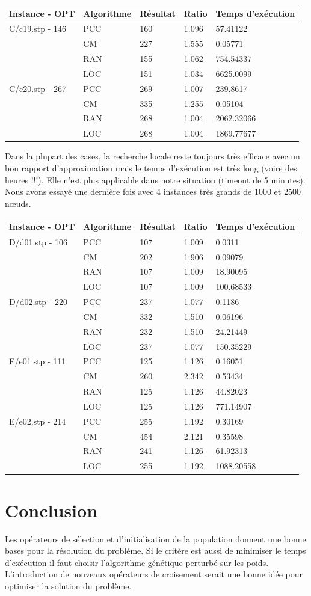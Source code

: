 \documentclass[12pt,a4paper]{article}
\begin{document}
\begin{center}
	\begin{tabular}{l|l|l|l|l}
		Instance - OPT & Algorithme & Résultat & Ratio & Temps d'exécution\\ \hline \hline
		C/c19.stp - 146&PCC&160&1.096&57.41122\\
		&CM&227&1.555&0.05771\\
		&RAN&155&1.062&754.54337\\
		&LOC&151&1.034&6625.0099\\\hline
		C/c20.stp - 267&PCC&269&1.007&239.8617\\
		&CM&335&1.255&0.05104\\
		&RAN&268&1.004&2062.32066\\
		&LOC&268&1.004&1869.77677\\\hline
	\end{tabular}
\end{center}		
Dans la plupart des cases, la recherche locale reste toujours très efficace avec un bon rapport d'approximation mais le temps d'exécution est très long (voire des heures !!!). Elle n'est plus applicable dans notre situation (timeout de 5 minutes).\\
Nous avons essayé une dernière fois avec 4 instances très grands de 1000 et 2500 nœuds.
\begin{center}
	\begin{tabular}{l|l|l|l|l}
		Instance - OPT & Algorithme & Résultat & Ratio & Temps d'exécution\\ \hline \hline
		D/d01.stp - 106&PCC&107&1.009&0.0311\\
		&CM&202&1.906&0.09079\\
		&RAN&107&1.009&18.90095\\
		&LOC&107&1.009&100.68533\\\hline
		D/d02.stp - 220&PCC&237&1.077&0.1186\\
		&CM&332&1.510&0.06196\\
		&RAN&232&1.510&24.21449\\
		&LOC&237&1.077&150.35229\\\hline
		E/e01.stp - 111&PCC&125&1.126&0.16051\\
		&CM&260&2.342&0.53434\\
		&RAN&125&1.126&44.82023\\
		&LOC&125&1.126&771.14907\\\hline
		E/e02.stp - 214&PCC&255&1.192&0.30169\\
		&CM&454&2.121&0.35598\\
		&RAN&241&1.126&61.92313\\
		&LOC&255&1.192&1088.20558\\\hline
	\end{tabular}
\end{center}
\section{Conclusion}
Les opérateurs de sélection et d'initialisation de la population donnent une bonne bases pour la résolution du problème. Si le critère est aussi de minimiser le temps d'exécution il faut choisir l'algorithme génétique perturbé sur les poids. L'introduction de nouveaux opérateurs de croisement serait une bonne idée pour optimiser la solution du problème.
\end{document}
